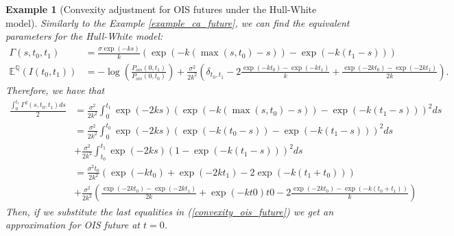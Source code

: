 \documentclass[a4paper,10pt]{article}
\newtheorem{example}[theorem]{Example}
\newcommand{\1}{\mathbf{1}}
\begin{document}
\begin{example}[Convexity adjustment for OIS futures under the Hull-White model]\label{example_convexity_hw_ois}
Similarly to the Example \ref{example_ca_future}, we can find the equivalent parameters for the Hull-White model: 
\begin{align*}
\Gamma(s,t_0,t_1) &= \frac{\sigma \exp(-ks)}{k}\left(\exp(-k(\max(s,t_0) - s)) - \exp(-k(t_1-s))\right)\\
\mathbb{E}^{\mathbb{Q}}\left(I(t_0,t_1)\right)&=-\log\left(\frac{P_{ois}(0,t_1)}{P_{ois}(0,t_0)}\right) + \frac{\sigma^{2}}{2k^{2}}\left(\delta_{t_0,t_1} - 2 \frac{\exp(-kt_0) - \exp(-kt_1)}{k} + \frac{\exp(-2kt_0) - \exp(-2kt_1)}{2k}  \right).
\end{align*}
Therefore, we have that
\begin{align*}
\frac{\int_{0}^{t_1} \Gamma^{2}(s,t_0,t_1) ds}{2} &= \frac{\sigma^{2}}{2k^2} \int_{0}^{t_1}  \exp(-2ks)\left(\exp(-k(\max(s,t_0) - s)) - \exp(-k(t_1 - s))\right)^{2} ds \\
&= \frac{\sigma^{2}}{2k^2} \int_{0}^{t_0} \exp(-2ks)\left(\exp(-k(t_0 - s)) - \exp(-k(t_1 - s))\right)^{2} ds\\
&+ \frac{\sigma^{2}}{2k^2} \int_{t_0}^{t_1} \exp(-2ks)\left(1 - \exp(-k(t_1 - s))\right)^{2} ds\\
&= \frac{\sigma^{2}t_0}{2k^{2}} \left( \exp(-kt_0) + \exp(-2kt_1) - 2 \exp(-k(t_1+t_0)) \right)\\  
&+ \frac{\sigma^{2}}{2k^{2}} \left(\frac{\exp(-2kt_0) - \exp(-2kt_1)}{2k}  + \exp(-kt0)t0 - 2 \frac{\exp(-2kt_0) - \exp(-k(t_0 + t_1))}{k}  \right)
\end{align*}
Then, if we substitute the last equalities in (\ref{convexity_ois_future}) we get an approximation for OIS future at $t=0$.\\


\end{example}
\end{document}
